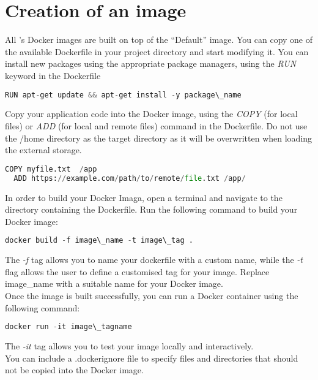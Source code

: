 \section{Creation of an image}
All \uninuvola's Docker images are built on top of the ``Default'' image. You can copy one of the available  Dockerfile in your project directory and start modifying it. You can install new packages using the appropriate package managers, using the \textit{RUN} keyword in the Dockerfile

\begin{lstlisting}[language=python]
  RUN apt-get update && apt-get install -y package\_name
\end{lstlisting}

Copy your application code into the Docker image, using the \textit{COPY} (for local files) or \textit{ADD} (for local and remote files) command in the Dockerfile. Do not use the /home directory as the target directory as it will be overwritten when loading the external storage.

\begin{lstlisting}[language=python]
  COPY myfile.txt  /app
  ADD https://example.com/path/to/remote/file.txt /app/
\end{lstlisting}

In order to build your Docker Imaga, open a terminal and navigate to the directory containing the Dockerfile. Run the following command to build your Docker image:

\begin{lstlisting}[language=python]
    docker build -f image\_name -t image\_tag .
\end{lstlisting}

The \textit{-f} tag allows you to name your dockerfile with a custom name, while the \textit{-t}  flag allows the user to define a customised tag for your image. Replace image\_name with a suitable name for your Docker image. \\

Once the image is built successfully, you can run a Docker container using the following command:

\begin{lstlisting}[language=python]
    docker run -it image\_tagname 
\end{lstlisting}
    
The \textit{-it} tag allows you to test your image locally and interactively. \\

You can include a .dockerignore file to specify files and directories that should not be copied into the Docker image. 